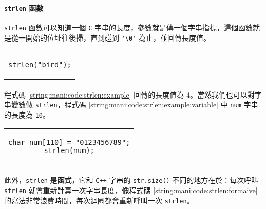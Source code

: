 \documentclass[12pt,a4paper,oneside]{report}
\begin{document}
\begin{CJK}{UTF8}{bkai}
\paragraph{\lstinline!strlen! 函數}\lstinline!strlen! 函數可以知道一個 \texttt{C} 字串的長度，參數就是傳一個字串指標，這個函數就是從一開始的位址往後掃，直到碰到 \lstinline!'\0'! 為止，並回傳長度值。

\begin{code}[h!]
  \centering
  \begin{tabular}{c}
  \begin{lstlisting}
strlen("bird");
  \end{lstlisting}
  \end{tabular}
  \caption{\lstinline!strlen! 範例}
  \label{string:mani:code:strlen:example}
\end{code}

\paragraph{}程式碼 \ref{string:mani:code:strlen:example} 回傳的長度值為 4。當然我們也可以對字串變數做 \lstinline!strlen!，程式碼 \ref{string:mani:code:strlen:example:variable} 中 \lstinline!num! 字串的長度為 \lstinline!10!。

\begin{code}[h!]
  \centering
  \begin{tabular}{c}
  \begin{lstlisting}
char num[110] = "0123456789";
strlen(num);
  \end{lstlisting}
  \end{tabular}
  \caption{\lstinline!strlen! 範例}
  \label{string:mani:code:strlen:example:variable}
\end{code}

\paragraph{}此外，\lstinline!strlen! 是{\color{blue}\textbf{函式}}，它和 \texttt{C++} 字串的 \lstinline!str.size()! 不同的地方在於：每次呼叫 \lstinline!strlen! 就會重新計算一次字串長度，像程式碼 \ref{string:mani:code:strlen:for:naive} 的寫法非常浪費時間，每次迴圈都會重新呼叫一次 \lstinline!strlen!。


\end{CJK}
\end{document}
